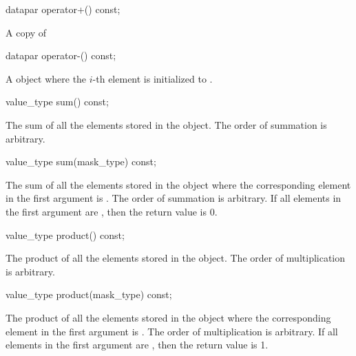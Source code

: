 \begin{itemdecl}
datapar operator+() const;
\end{itemdecl}
\begin{itemdescr}
  \pnum \returns A copy of 
\end{itemdescr}

\begin{itemdecl}
datapar operator-() const;
\end{itemdecl}
\begin{itemdescr}
  \pnum\returns A \datapar object where the $i$-th element is initialized to  \foralli.
\end{itemdescr}

\begin{itemdecl}
value_type sum() const;
\end{itemdecl}
\begin{itemdescr}
  \pnum\returns The sum of all the elements stored in the \datapar object.
    The order of summation is arbitrary.
\end{itemdescr}

\begin{itemdecl}
value_type sum(mask_type) const;
\end{itemdecl}
\begin{itemdescr}
  \pnum\returns The sum of all the elements stored in the \datapar object where the corresponding element in the first argument is \true.
  The order of summation is arbitrary.
  If all elements in the first argument are \false, then the return value is 0.
\end{itemdescr}

\begin{itemdecl}
value_type product() const;
\end{itemdecl}
\begin{itemdescr}
  \pnum\returns The product of all the elements stored in the \datapar object.
    The order of multiplication is arbitrary.
\end{itemdescr}

\begin{itemdecl}
value_type product(mask_type) const;
\end{itemdecl}
\begin{itemdescr}
  \pnum\returns The product of all the elements stored in the \datapar object where the corresponding element in the first argument is \true.
  The order of multiplication is arbitrary.
  If all elements in the first argument are \false, then the return value is 1.
\end{itemdescr}

